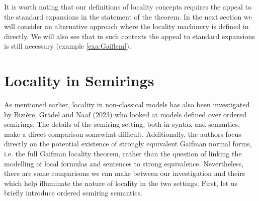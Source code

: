 \documentclass{lmcs} %
\newcommand{\?}{\ensuremath{\mkern0.4\thinmuskip}}
\begin{document}
\begin{rem}
    It is worth noting that our definitions of locality concepts requires the appeal to the standard expansions in the statement of the theorem. In the next section we will consider an alternative approach where the locality machinery is defined in directly. We will also see that in such contexts the appeal to standard expansions is still necessary (example \ref{exa:Gaiflem}).  
\end{rem}


\section{Locality in Semirings}\label{sec:semirings}
As mentioned earlier, locality in non-classical models has also been investigated by Bizi\`{e}re, Gr\"{a}del and Naaf (2023) who looked at models defined over ordered semirings. The details of the semiring setting, both in syntax and semantics, make a direct comparison somewhat difficult. Additionally, the authors focus directly on the potential existence of strongly equivalent Gaifman normal forms, i.e. the full Gaifman locality theorem, rather than the question of linking the modelling of local formulas and sentences to strong equivalence. Nevertheless, there are some comparisons we can make between our investigation and theirs which help illuminate the nature of locality in the two settings. First, let us briefly introduce ordered semiring semantics. 
\end{document}
